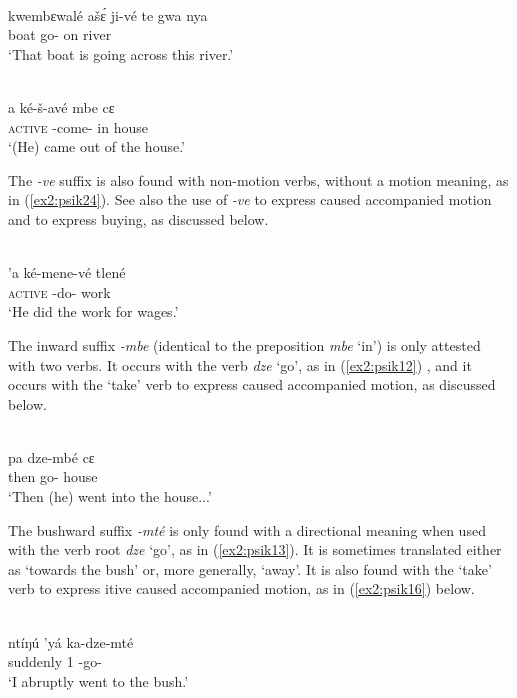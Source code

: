 \ea\label{ex2:psik10}
 \\
\gll kwembɛwalé ašɛ́ ji-vé te gwa nya\\
boat  go- on river 	\\
\glt `That boat is going across this river.'

\ex\label{ex2:psik11}
 \\
\gll a ké-š-avé mbe cɛ	\\
\textsc{active} -come- in house	\\
\glt `(He) came out of the house.'
\z 

The \textit{-ve} suffix is also found with non-motion verbs, without a motion meaning, as in (\ref{ex2:psik24}). See also the use of \textit{-ve} to express caused accompanied motion and to express buying, as discussed below. 

\ea\label{ex2:psik24}
 \\
\gll  'a ké-mene-vé tlené	\\
\textsc{active} -do- work	\\
\glt `He did the work for wages.'
\z

The inward suffix \textit{-mbe} (identical to the preposition \textit{mbe} `in') is only attested with two verbs. It occurs with the verb \textit{dze} `go', as in (\ref{ex2:psik12}) \citep[118]{smithKapsikiLanguage1969}, and it occurs with the `take' verb to express caused accompanied motion, as discussed below. 

\ea\label{ex2:psik12}
 \\
\gll pa dze-mbé cɛ	\\
then go- house	\\
\glt `Then (he) went into the house...'
\z 

The bushward suffix \textit{-mté} is only found with a directional meaning when used with the verb root \textit{dze} `go', as in (\ref{ex2:psik13}). It is sometimes translated either as `towards the bush' or, more generally, `away'. It is also found with the `take' verb to express itive caused accompanied motion, as in (\ref{ex2:psik16}) below. 

\ea\label{ex2:psik13}
 \\
\gll ntíŋú 'yá ka-dze-mté \\
suddenly 1 -go-	\\
\glt `I abruptly went to the bush.'
\z 

